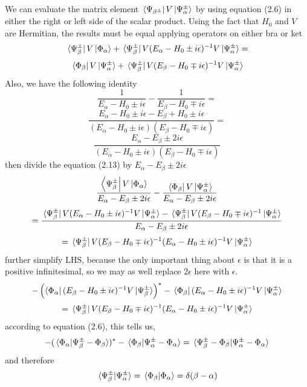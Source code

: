 \documentclass[12pt]{article}
\numberwithin{equation}{section}
\begin{document}
We can evaluate the matrix element $\bra*{\Psi_{\beta^{\pm}}}V\ket*{\Psi_{\alpha}^{\pm}}$ by using equation (2.6) in either the right or left side of the scalar product.
Using the fact that $H_0$ and $V$ are Hermitian, the results must be equal applying operators on either bra or ket
\[\bra*{\Psi^{\pm}_{\beta}}V\ket*{\Phi_{\alpha}}+\bra*{\Psi^{\pm}_{\beta}}V(E_{\alpha}-H_0\pm i\epsilon)^{-1}V\ket*{\Psi^{\pm}_{\alpha}}= \]
\begin{equation}
    \bra*{\Phi_{\beta}}V\ket*{\Psi^{\pm}_{\alpha}} + \bra*{\Psi_{\beta}^{\pm}}V(E_{\beta}-H_0\mp i\epsilon)^{-1}V\ket*{\Psi_{\alpha}^{\pm}}
\end{equation}
Also, we have the following identity
\[\frac{1}{E_{\alpha}-H_0\pm i\epsilon}-\frac{1}{E_{\beta}-H_0\mp i\epsilon} =\]
\[\frac{E_{\alpha}-H_0\pm i\epsilon - E_{\beta}+H_0\pm i\epsilon}{\left(E_{\alpha}-H_0\pm i\epsilon\right)\left(E_{\beta}-H_0\mp i\epsilon\right)}=\]
\begin{equation}
    \frac{E_{\alpha}-E_{\beta}\pm 2i\epsilon}{\left(E_{\alpha}-H_0\pm i\epsilon\right)\left(E_{\beta}-H_0\mp i\epsilon\right)}
\end{equation}
then divide the equation (2.13) by $E_{\alpha}-E_{\beta}\pm 2i\epsilon$
\[\frac{\bra{\Psi_{\beta}^{\pm}}V\ket*{\Phi_{\alpha}}}{E_{\alpha}-E_{\beta}\pm 2i\epsilon}-\frac{\bra*{\Phi_{\beta}}V\ket*{\Psi_{\alpha}^{\pm}}}{E_{\alpha}-E_{\beta}\pm 2i\epsilon}\]
\[=\frac{\bra*{\Psi_{\beta}^{\pm}}V(E_{\alpha}-H_0\pm i\epsilon)^{-1}V\ket*{\Psi_{\alpha}^{\pm}}-\bra*{\Psi_{\beta}^{\pm}}V(E_{\beta}-H_0\mp i\epsilon)^{-1}\ket*{\Psi_{\alpha}^{\pm}}}{E_{\alpha}-E_{\beta}\pm 2i\epsilon}\]
\begin{equation}
    =\bra*{\Psi_{\beta}^{\pm}}V(E_{\beta}-H_0\mp i\epsilon)^{-1}(E_{\alpha}-H_0\pm i\epsilon)^{-1}V\ket*{\Psi_{\alpha}^{\pm}}
\end{equation}
further simplify LHS, because the only important thing about $\epsilon$ is that it is a positive infinitesimal, so we may as well replace $2\epsilon$ here with $\epsilon$.
\[-\left(\bra{\Phi_{\alpha}}(E_{\beta}-H_0\pm i\epsilon)^{-1}V\ket*{\Psi_{\beta}^{\pm}}\right)^{*} - \bra*{\Phi_{\beta}}(E_{\alpha}-H_0\pm i\epsilon)^{-1}V\ket*{\Psi_{\alpha}^{\pm}}\]
\begin{equation}
    =\bra*{\Psi_{\beta}^{\pm}}V(E_{\beta}-H_0\mp i\epsilon)^{-1}(E_{\alpha}-H_0\pm i\epsilon)^{-1}V\ket*{\Psi_{\alpha}^{\pm}}
\end{equation}
according to equation (2.6), this tells us,
\begin{equation}
    -(\bra*{\Phi_{\alpha}}\ket*{\Psi_{\beta}^{\pm}-\Phi_{\beta}})^{*}-\braket*{\Phi_{\beta}}{\Psi_{\alpha}^{\pm}-\Phi_{\alpha}} = \braket*{\Psi_{\beta}^{\pm}-\Phi_{\beta}}{\Psi_{\alpha}^{\pm}-\Phi_{\alpha}}
\end{equation}
and therefore 
\begin{equation}
    \braket*{\Psi_{\beta}^{\pm}}{\Psi_{\alpha}^{\pm}} = \braket*{\Phi_{\beta}}{\Phi_{\alpha}} = \delta(\beta-\alpha)
\end{equation}
\end{document}

